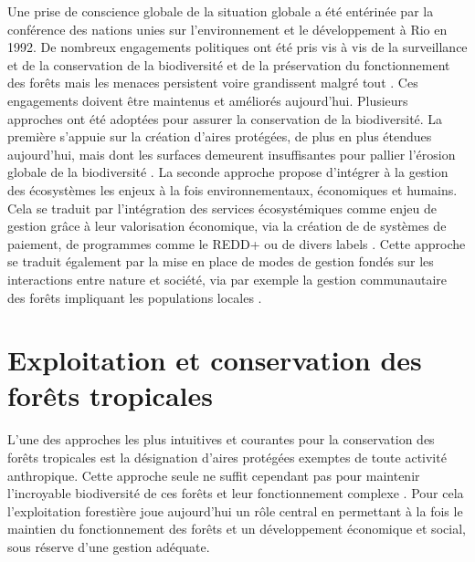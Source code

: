 \documentclass[
  11pt,
  french,
  A4paper,
  extrafontsizes,onecolumn,openright
  ]{memoir}
\begin{document}
Une prise de conscience globale de la situation globale a été entérinée
par la conférence des nations unies sur l'environnement et le
développement à Rio en 1992. De nombreux engagements politiques ont été
pris vis à vis de la surveillance et de la conservation de la
biodiversité et de la préservation du fonctionnement des forêts mais les
menaces persistent voire grandissent malgré tout
\autocites{Summit1992}{Schlaepfer2000}{Dirzo2003a}{Morales-Hidalgo2015}.
Ces engagements doivent être maintenus et améliorés aujourd'hui.
Plusieurs approches ont été adoptées pour assurer la conservation de la
biodiversité. La première s'appuie sur la création d'aires protégées, de
plus en plus étendues aujourd'hui, mais dont les surfaces demeurent
insuffisantes pour pallier l'érosion globale de la biodiversité
\autocite{Sist2015}. La seconde approche propose d'intégrer à la gestion
des écosystèmes les enjeux à la fois environnementaux, économiques et
humains. Cela se traduit par l'intégration des services écosystémiques
comme enjeu de gestion grâce à leur valorisation économique, via la
création de de systèmes de paiement, de programmes comme le REDD+ ou de
divers labels \autocites{Agrawal2011}{Barlow2018}. Cette approche se
traduit également par la mise en place de modes de gestion fondés sur
les interactions entre nature et société, via par exemple la gestion
communautaire des forêts impliquant les populations locales
\autocite{Liu2015}.

\section{Exploitation et conservation des forêts
tropicales}\label{exploitation-et-conservation-des-forets-tropicales}

L'une des approches les plus intuitives et courantes pour la
conservation des forêts tropicales est la désignation d'aires protégées
exemptes de toute activité anthropique. Cette approche seule ne suffit
cependant pas pour maintenir l'incroyable biodiversité de ces forêts et
leur fonctionnement complexe \autocite{Sist2015}. Pour cela
l'exploitation forestière joue aujourd'hui un rôle central en permettant
à la fois le maintien du fonctionnement des forêts et un développement
économique et social, sous réserve d'une gestion adéquate.
\end{document}
